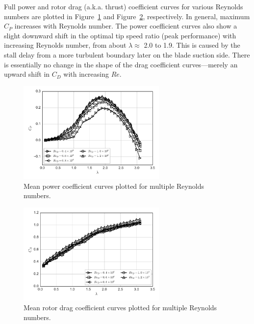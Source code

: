 \documentclass[energies,article,accept,moreauthors,pdftex,12pt,a4paper]{mdpi}
\begin{document}
Full power and rotor drag (a.k.a. thrust) coefficient curves for various
Reynolds numbers are plotted in Figure~\ref{fig:cp-curves} and
Figure~\ref{fig:cd-curves}, respectively. In general, maximum $C_P$ increases
with Reynolds number. The power coefficient curves also show a slight downward
shift in the optimal tip speed ratio (peak performance) with increasing Reynolds
number, from about $\lambda \approx$ 2.0 to 1.9. This is caused by the stall
delay from a more turbulent boundary later on the blade suction side. There is
essentially no change in the shape of the drag coefficient curves---merely an
upward shift in $C_D$ with increasing $Re$.

\begin{figure}[ht]
\centering

\includegraphics[width=0.65\textwidth]{figures/cp_curves}

\caption{Mean power coefficient curves plotted for multiple Reynolds numbers.}

\label{fig:cp-curves}
\end{figure}

\begin{figure}[ht]
\centering

\includegraphics[width=0.65\textwidth]{figures/cd_curves}

\caption{Mean rotor drag coefficient curves plotted for multiple Reynolds
    numbers.}

\label{fig:cd-curves}
\end{figure}
\end{document}
